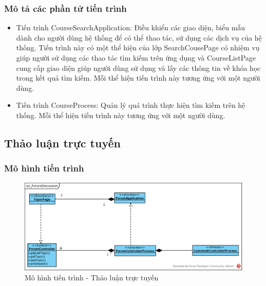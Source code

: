 \documentclass[./../main.tex]{subfiles}
\begin{document}
\subsubsection{Mô tả các phần tử tiến trình}
\begin{itemize}
	\item Tiến trình CourseSearchApplication: Điều khiển các giao diện, biểu mẫu dành cho người dùng hệ thống để có thể thao tác, sử dụng các dịch vụ của hệ thống. Tiến trình này có một thể hiện của lớp SearchCousePage có nhiệm vụ giúp người sử dụng các thao tác tìm kiếm trên ứng dụng và CourseListPage cung cấp giao diện giúp người dùng sử dụng và lấy các thông tin về khóa học trong kết quả tìm kiếm.
	Mỗi thể hiện tiến trình này tương ứng với một người dùng.
	\item Tiến trình CourseProcess: Quản lý quá trình thực hiện tìm kiếm trên hệ thống.
	Mỗi thể hiện tiến trình này tương ứng với một người dùng.
	
\end{itemize}

\subsection{Thảo luận trực tuyến}

\subsubsection{Mô hình tiến trình}

\begin{figure}[H]
	\centering
	\includegraphics[width=\linewidth]{./images/pv_ForumDiscussion.eps}
	\caption{Mô hình tiến trình - Thảo luận trực tuyến}
\end{figure}
\end{document}
